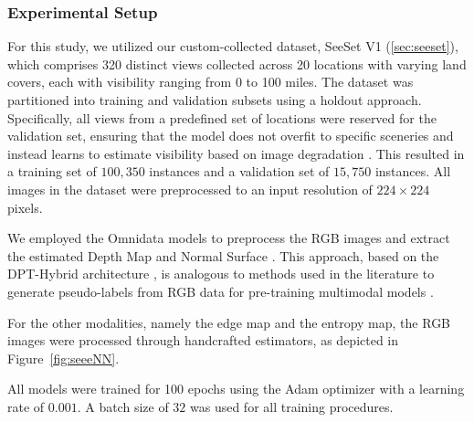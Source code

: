 \subsubsection{Experimental Setup}

For this study, we utilized our custom-collected dataset, SeeSet V1 (\ref{sec:seeset}), which comprises 320 distinct views collected across 20 locations with varying land covers, each with visibility ranging from 0 to 100 miles. The dataset was partitioned into training and validation subsets using a holdout approach. Specifically, all views from a predefined set of locations were reserved for the validation set, ensuring that the model does not overfit to specific sceneries and instead learns to estimate visibility based on image degradation \cite{Bouhsine2022}. This resulted in a training set of $100,350$ instances and a validation set of $15,750$ instances. All images in the dataset were preprocessed to an input resolution of $224 \times 224$ pixels.

We employed the Omnidata models to preprocess the RGB images and extract the estimated Depth Map and Normal Surface \cite{eftekhar2021omnidata}. This approach, based on the DPT-Hybrid architecture \cite{ranftl2021vision}, is analogous to methods used in the literature to generate pseudo-labels from RGB data for pre-training multimodal models \cite{bachmann2022multimae, wang2024largescale}.

For the other modalities, namely the edge map and the entropy map, the RGB images were processed through handcrafted estimators, as depicted in Figure~\ref{fig:seeeNN}.

All models were trained for 100 epochs using the Adam optimizer with a learning rate of $0.001$. A batch size of $32$ was used for all training procedures.
